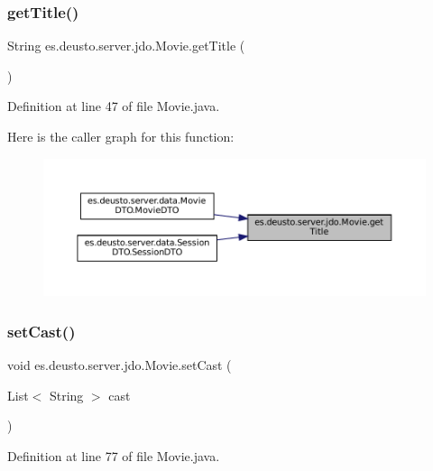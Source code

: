\subsubsection{\texorpdfstring{getTitle()}{getTitle()}}
{\footnotesize\ttfamily String es.\+deusto.\+server.\+jdo.\+Movie.\+get\+Title (\begin{DoxyParamCaption}{ }\end{DoxyParamCaption})}



Definition at line 47 of file Movie.\+java.

Here is the caller graph for this function\+:
\nopagebreak
\begin{figure}[H]
\begin{center}
\leavevmode
\includegraphics[width=350pt]{classes_1_1deusto_1_1server_1_1jdo_1_1_movie_aa69d66c8aa0135b6ae9b809cf0692389_icgraph}
\end{center}
\end{figure}
\mbox{\label{classes_1_1deusto_1_1server_1_1jdo_1_1_movie_aab7fa1af2944677769c47300ea061e3b}} 
\subsubsection{\texorpdfstring{setCast()}{setCast()}}
{\footnotesize\ttfamily void es.\+deusto.\+server.\+jdo.\+Movie.\+set\+Cast (\begin{DoxyParamCaption}\item[{List$<$ String $>$}]{cast }\end{DoxyParamCaption})}



Definition at line 77 of file Movie.\+java.

